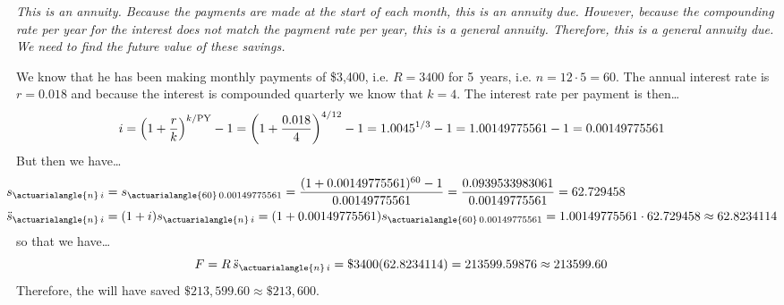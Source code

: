 \documentclass[12pt,letterpaper]{exam}
\begin{document}
\begin{questions}
{\itshape 
\sol This is an annuity. Because the payments are made at the start of each month, this is an annuity due. However, because the compounding rate per year for the interest does not match the payment rate per year, this is a general annuity. Therefore, this is a general annuity due. We need to find the future value of these savings. \pspace

We know that he has been making monthly payments of \$3,400, i.e. $R= 3400$ for 5~years, i.e. $n= 12 \cdot 5= 60$. The annual interest rate is $r= 0.018$ and because the interest is compounded quarterly we know that $k= 4$. The interest rate per payment is then\dots
	\[
	\hspace{-0.5cm} i= \left(1 + \dfrac{r}{k} \right)^{k/\text{PY}} - 1= \left(1 + \dfrac{0.018}{4} \right)^{4/12} - 1= 1.0045^{1/3} - 1= 1.00149775561 - 1= 0.00149775561
	\]
But then we have\dots
	\[
	\begin{aligned}
	\hspace{-0.5cm} s_{\actuarialangle{n}\,i}&= s_{\actuarialangle{60}\,0.00149775561}= \dfrac{(1 + 0.00149775561)^{60} - 1}{0.00149775561}= \dfrac{0.0939533983061}{0.00149775561}= 62.729458 \\
	\hspace{-0.5cm} \ddot{s}_{\actuarialangle{n}\,i}&= (1 + i) s_{\actuarialangle{n}\,i}= (1 + 0.00149775561) s_{\actuarialangle{60}\,0.00149775561}= 1.00149775561 \cdot 62.729458 \approx 62.8234114
	\end{aligned}
	\]
so that we have\dots
	\[
	F= R\, \ddot{s}_{\actuarialangle{n}\,i}= \$3400 (62.8234114)= 213599.59876 \approx 213599.60
	\]
Therefore, the will have saved $\$213,599.60 \approx \$213,600$. 
}


\end{questions}
\end{document}
